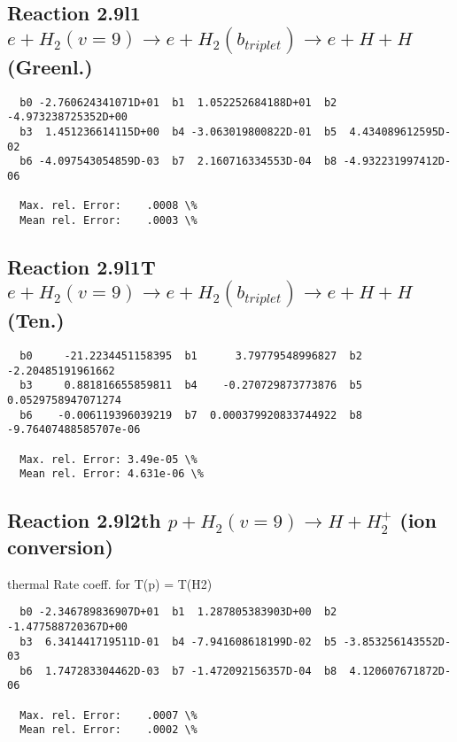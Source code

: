\documentclass[12pt,dvipdfmx]{article}
\begin{document}
\newpage
\subsection{
Reaction 2.9l1
$ e + H_2(v=9) \rightarrow e + H_2(b_{triplet})\rightarrow e + H + H $ (Greenl.)
}


\begin{small}\begin{verbatim}
  b0 -2.760624341071D+01  b1  1.052252684188D+01  b2 -4.973238725352D+00
  b3  1.451236614115D+00  b4 -3.063019800822D-01  b5  4.434089612595D-02
  b6 -4.097543054859D-03  b7  2.160716334553D-04  b8 -4.932231997412D-06

  Max. rel. Error:    .0008 \%
  Mean rel. Error:    .0003 \%
\end{verbatim}\end{small}


\subsection{
Reaction 2.9l1T
$ e +  H_2(v=9) \rightarrow e + H_2(b_{triplet}) \rightarrow e + H + H $ (Ten.)
}


\begin{small}\begin{verbatim}
  b0     -21.2234451158395  b1      3.79779548996827  b2     -2.20485191961662
  b3     0.881816655859811  b4    -0.270729873773876  b5    0.0529758947071274
  b6    -0.006119396039219  b7  0.000379920833744922  b8 -9.76407488585707e-06

  Max. rel. Error: 3.49e-05 \%
  Mean rel. Error: 4.631e-06 \%
\end{verbatim}\end{small}


\subsection{
Reaction 2.9l2th
$ p + H_2(v=9) \rightarrow H + H_2^+$ (ion conversion)
}
thermal Rate coeff. for T(p) = T(H2)

\begin{small}\begin{verbatim}
  b0 -2.346789836907D+01  b1  1.287805383903D+00  b2 -1.477588720367D+00
  b3  6.341441719511D-01  b4 -7.941608618199D-02  b5 -3.853256143552D-03
  b6  1.747283304462D-03  b7 -1.472092156357D-04  b8  4.120607671872D-06

  Max. rel. Error:    .0007 \%
  Mean rel. Error:    .0002 \%
\end{verbatim}\end{small}
\end{document}
